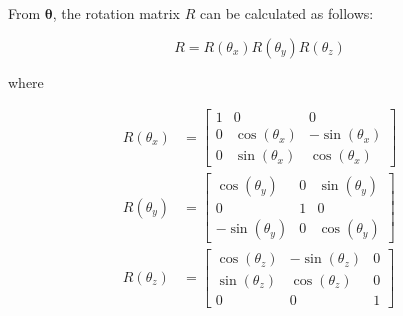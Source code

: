 From \(\boldsymbol{\theta}\), the rotation matrix $R$ can be calculated as follows:

\begin{equation}
	R = R(\theta_x) R(\theta_y) R(\theta_z)
\end{equation} 

where

\begin{align}
	R(\theta_x) & =
	\begin{bmatrix}
		1 & 0              & 0               \\
		0 & \cos(\theta_x) & -\sin(\theta_x) \\
		0 & \sin(\theta_x) & \cos(\theta_x)
	\end{bmatrix} \\
	R(\theta_y) & =
	\begin{bmatrix}
		\cos(\theta_y)  & 0 & \sin(\theta_y) \\
		0               & 1 & 0              \\
		-\sin(\theta_y) & 0 & \cos(\theta_y)
	\end{bmatrix}     \\
	R(\theta_z) & =
	\begin{bmatrix}
		\cos(\theta_z) & -\sin(\theta_z) & 0 \\
		\sin(\theta_z) & \cos(\theta_z)  & 0 \\
		0              & 0               & 1
	\end{bmatrix}
\end{align}

